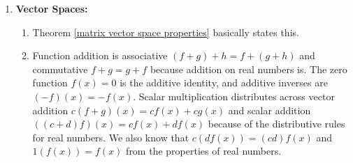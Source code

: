 {\begin{multicols}{2}
\begin{enumerate}
\begin{enumerate}
	\item 
	(1) Infinitely many solutions, 
	(2) not unique solutions, 
	(3) rref is not $I$,
	(4) column 2 is not a pivot,
	(5) columns are dependent,
	(6) rank is 1 (less than 2),
	(7) rows are dependent,
	(8) 
	$
	\begin{bmatrix}[cc|cc] 2&1&1&0\\4&2&0&1\end{bmatrix}
	\xrightarrow{rref}
	\begin{bmatrix}[cc|cc] 1&1/2&0&1/4 \\0&0&1&-1/2\end{bmatrix}
	$ so $(1,0)$ is not in column space,
	(9) $A\inv$ does not exist,
	(10) $|A|=0 $,
	(11) $\lambda = 4, 0$ (zero is an eigenvalue).

	\item The only solution to the homogeneous system is zero, which means all 11 items are true. In particular, $A\inv=\begin{bmatrix}  
	\frac{2}{3} & -\frac{1}{3} & -\frac{2}{9} \\
 -\frac{1}{3} & \frac{2}{3} & -\frac{5}{9} \\
 0 & 0 & \frac{1}{3}
 \end{bmatrix}$, 
	$|A| = 9$, $\lambda = 3,3,1$.
	
	\item There is more than one solution to the homogeneous system. So all 11 items are false.  $|A|=0$.  The eigenvalues are $\frac12(-1 -\sqrt{21}), \frac12 (-1 + \sqrt{21}), 0$ (zero is an eigenvalue).
	
\end{enumerate}






\item \textbf{Vector Spaces:}  

\begin{enumerate}
	\item Theorem \ref{matrix vector space properties} basically states this. 
	\item Function addition is associative $(f+g)+h=f+(g+h)$ and commutative $f+g=g+f$ because addition on real numbers is.  The zero function $f(x)=0$ is the additive identity, and additive inverses are $(-f)(x) = -f(x)$. Scalar multiplication distributes across vector addition $c(f+g)(x) = cf(x)+cg(x)$ and scalar addition $((c+d)f)(x) = cf(x)+df(x)$ because of the distributive rules for real numbers. We also know that $c(df(x)) = (cd)f(x)$ and $1(f(x))=f(x)$ from the properties of real numbers.
	

\end{enumerate}
\end{enumerate}
\end{multicols}}
